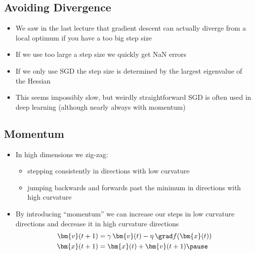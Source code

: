 \begin{slide}
\section{Avoiding Divergence}

\begin{PauseHighLight}
  \begin{itemize}
  \item We saw in the last lecture that gradient descent can actually
    diverge from a local optimum if you have a too big step size\pause
  \item If we use too large a step size we quickly get NaN
    errors\pause
  \item If we only use SGD the step size is determined by the largest
    eigenvalue of the Hessian\pause
  \item This seems impossibly slow\pauseb, but weirdly straightforward
    SGD is often used in deep learning\pauseb{} (although nearly always with momentum)\pauseb
  \end{itemize}
\end{PauseHighLight}

\end{slide}


\begin{slide}
  \section{Momentum}

  \begin{PauseHighLight}
    \begin{itemize}
    \item In high dimensions we zig-zag:
      \begin{itemize}
      \item stepping consistently in directions with low curvature
      \item jumping backwards and forwards past the minimum in
        directions with high curvature\pause
      \end{itemize}
    \item By introducing ``momentum'' we can increase our steps in
      low curvature directions and decrease it in high curvature
      directions
      \begin{align*}
        \bm{v}(t+1) &= \gamma \, \bm{v}(t) -  \eta\, \grad f(\bm{x}(t))\\
        \bm{x}(t+1) &= \bm{x}(t) + \bm{v}(t+1)\pause
      \end{align*}
    \end{itemize}
  \end{PauseHighLight}


\end{slide}


